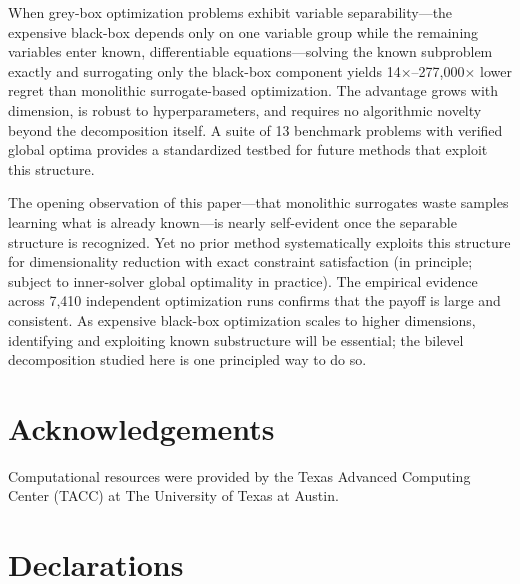 \documentclass[12pt,a4paper]{article}%
\theoremstyle{plain}%
\theoremstyle{remark}%
\theoremstyle{definition}%
\begin{document}
When grey-box optimization problems exhibit variable separability---the expensive black-box depends only on one variable group while the remaining variables enter known, differentiable equations---solving the known subproblem exactly and surrogating only the black-box component yields 14$\times$--277{,}000$\times$ lower regret than monolithic surrogate-based optimization. The advantage grows with dimension, is robust to hyperparameters, and requires no algorithmic novelty beyond the decomposition itself. A suite of 13 benchmark problems with verified global optima provides a standardized testbed for future methods that exploit this structure.

The opening observation of this paper---that monolithic surrogates waste samples learning what is already known---is nearly self-evident once the separable structure is recognized. Yet no prior method systematically exploits this structure for dimensionality reduction with exact constraint satisfaction (in principle; subject to inner-solver global optimality in practice). The empirical evidence across 7{,}410 independent optimization runs confirms that the payoff is large and consistent. As expensive black-box optimization scales to higher dimensions, identifying and exploiting known substructure will be essential; the bilevel decomposition studied here is one principled way to do so.

\section*{Acknowledgements}

Computational resources were provided by the Texas Advanced Computing Center (TACC) at The University of Texas at Austin.

\section*{Declarations}
\end{document}
